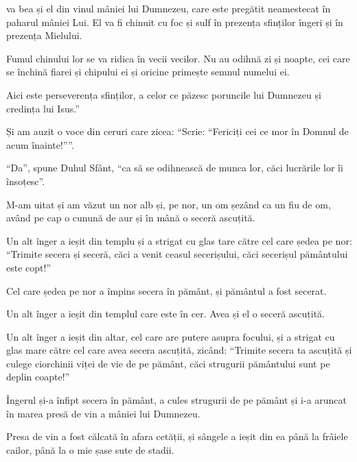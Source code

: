 {va bea și el din vinul mâniei lui Dumnezeu, care este pregătit neamestecat în paharul mâniei Lui. El va fi chinuit cu foc și sulf în prezența sfinților îngeri și în prezența Mielului.

Fumul chinului lor se va ridica în vecii vecilor. Nu au odihnă zi și noapte, cei care se închină fiarei și chipului ei și oricine primește semnul numelui ei.


\par }{\PP {}Aici este perseverența sfinților, a celor ce păzesc poruncile lui Dumnezeu și credința lui Isus.”


\par }{\PP {}Și am auzit o voce din ceruri care zicea: “Scrie: “Fericiți cei ce mor în Domnul de acum înainte!””.

\par }{\PP “Da”, spune Duhul Sfânt, “ca să se odihnească de munca lor, căci lucrările lor îi însoțesc”.


\par }{\PP {}M-am uitat și am văzut un nor alb și, pe nor, un om șezând ca un fiu de om, având pe cap o cunună de aur și în mână o seceră ascuțită.

Un alt înger a ieșit din templu și a strigat cu glas tare către cel care ședea pe nor: “Trimite secera și seceră, căci a venit ceasul secerișului, căci secerișul pământului este copt!”

Cel care ședea pe nor a împins secera în pământ, și pământul a fost secerat.


\par }{\PP {}Un alt înger a ieșit din templul care este în cer. Avea și el o seceră ascuțită.

Un alt înger a ieșit din altar, cel care are putere asupra focului, și a strigat cu glas mare către cel care avea secera ascuțită, zicând: “Trimite secera ta ascuțită și culege ciorchinii viței de vie de pe pământ, căci strugurii pământului sunt pe deplin coapte!”

Îngerul și-a înfipt secera în pământ, a cules strugurii de pe pământ și i-a aruncat în marea presă de vin a mâniei lui Dumnezeu.

Presa de vin a fost călcată în afara cetății, și sângele a ieșit din ea până la frâiele cailor, până la o mie șase sute de stadii.



}
